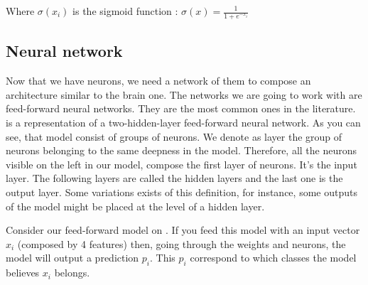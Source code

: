 		Where $\sigma(x_i)$ is the sigmoid function : $\sigma(x) = \frac{1}{1+e^{-x_i}}$



	\subsection{Neural network}
		Now that we have neurons, we need a network of them to compose an architecture similar to the brain one. The networks we are going to work with are feed-forward neural networks. They are the most common ones in the literature.  is a representation of a two-hidden-layer feed-forward neural network. As you can see, that model consist of groups of neurons. We denote as layer the group of neurons belonging to the same deepness in the model. Therefore, all the neurons visible on the left in our model, compose the first layer of neurons. It's the input layer. The following layers are called the hidden layers and the last one is the output layer. Some variations exists of this definition, for instance, some outputs of the model might be placed at the level of a hidden layer.

		Consider our feed-forward model on . If you feed this model with an input vector $x_i$ (composed by 4 features) then, going through the weights and neurons, the model will output a prediction $p_i$. This $p_i$ correspond to which classes the model believes $x_i$ belongs.
		

